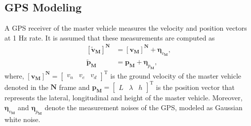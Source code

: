 \documentclass[3p]{elsarticle}
\begin{document}
\subsection{GPS Modeling}
\noindent A GPS receiver of the master vehicle measures the velocity and position vectors at 1 Hz rate. It is assumed that these measurements are computed as
\begin{align}
    \label{eq:gps_meas1}
    {\left[\tilde{{\mathbf{v}}}_{\mathbf{M}}\right]}^{\mathbf{N}} &= {\left[{\mathbf{v}}_{\mathbf{M}}\right]}^{\mathbf{N}} + \boldsymbol{\eta}_{v_{\mathbf{M}}}, \\
    \label{eq:gps_meas2}
    \tilde{{\mathbf{p}}}_{\mathbf{M}} &= {\mathbf{p}_{\mathbf{M}}} + \boldsymbol{\eta}_{p_{\mathbf{M}}},
\end{align}
where, \({\left[\mathbf{v}_{\mathbf{M}}\right]}^{\mathbf{N}} = \begin{bmatrix}
	v_n & v_e & v_d
	\end{bmatrix}^{\mathrm{T}}\) is the ground velocity of the master vehicle denoted in the \({\mathbf{N}}\) frame and \(\mathbf{p}_{\mathbf{M}} = \begin{bmatrix}
		L & \lambda & h
		\end{bmatrix}^{\mathrm{T}}\) is the position vector that represents the  lateral, longitudinal and height of the master vehicle. Moreover, \(\boldsymbol{\eta}_{v_{\mathbf{M}}}\) and \(\boldsymbol{\eta}_{p_{\mathbf{M}}}\) denote the measurement noises of the GPS, modeled as Gaussian white noise.
\end{document}
